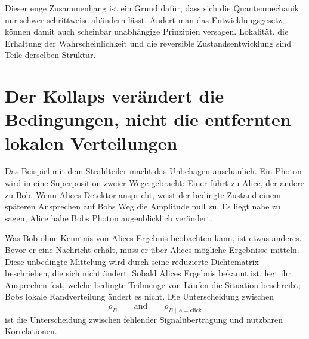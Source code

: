 Dieser enge Zusammenhang ist ein Grund dafür, dass sich die Quantenmechanik nur schwer schrittweise abändern lässt. Ändert man das Entwicklungsgesetz, können damit auch scheinbar unabhängige Prinzipien versagen. Lokalität, die Erhaltung der Wahrscheinlichkeit und die reversible Zustandsentwicklung sind Teile derselben Struktur.

\begin{classroomqa}
\end{classroomqa}

\section{Der Kollaps verändert die Bedingungen, nicht die entfernten lokalen Verteilungen}

Das Beispiel mit dem Strahlteiler macht das Unbehagen anschaulich. Ein Photon wird in eine Superposition zweier Wege gebracht: Einer führt zu Alice, der andere zu Bob. Wenn Alices Detektor anspricht, weist der bedingte Zustand einem späteren Ansprechen auf Bobs Weg die Amplitude null zu. Es liegt nahe zu sagen, Alice habe Bobs Photon augenblicklich verändert.

Was Bob ohne Kenntnis von Alices Ergebnis beobachten kann, ist etwas anderes. Bevor er eine Nachricht erhält, muss er über Alices mögliche Ergebnisse mitteln. Diese unbedingte Mittelung wird durch seine reduzierte Dichtematrix beschrieben, die sich nicht ändert. Sobald Alices Ergebnis bekannt ist, legt ihr Ansprechen fest, welche bedingte Teilmenge von Läufen die Situation beschreibt; Bobs lokale Randverteilung ändert es nicht. Die Unterscheidung zwischen
\begin{equation}
\rho_B
\qquad\text{and}\qquad
\rho_{B\mid A=\text{click}}
\end{equation}
ist die Unterscheidung zwischen fehlender Signalübertragung und nutzbaren Korrelationen.

\begin{classroomqa}
\end{classroomqa}


